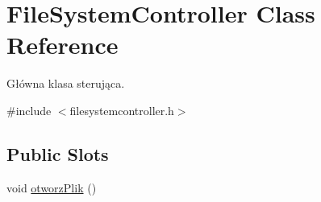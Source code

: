 \hypertarget{class_file_system_controller}{
\section{FileSystemController Class Reference}
\label{class_file_system_controller}
}


Główna klasa sterująca.  




{\ttfamily \#include $<$filesystemcontroller.h$>$}

\subsection*{Public Slots}
\begin{DoxyCompactItemize}
\item 
\hypertarget{class_file_system_controller_a7be597339c97c02755f0eef7988425e1}{
void \hyperlink{class_file_system_controller_a7be597339c97c02755f0eef7988425e1}{otworzPlik} ()}
\label{class_file_system_controller_a7be597339c97c02755f0eef7988425e1}


\end{DoxyCompactItemize}
